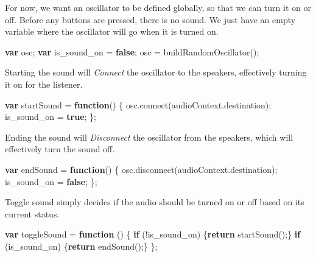 \documentclass[]{article}
\newenvironment{Shaded}{}{}
\newcommand{\KeywordTok}[1]{\textcolor[rgb]{0.00,0.44,0.13}{\textbf{#1}}}
\newcommand{\VariableTok}[1]{\textcolor[rgb]{0.10,0.09,0.49}{#1}}
\newcommand{\ControlFlowTok}[1]{\textcolor[rgb]{0.00,0.44,0.13}{\textbf{#1}}}
\newcommand{\OperatorTok}[1]{\textcolor[rgb]{0.40,0.40,0.40}{#1}}
\newcommand{\AttributeTok}[1]{\textcolor[rgb]{0.49,0.56,0.16}{#1}}
\newcommand{\NormalTok}[1]{#1}
\begin{document}
For now, we want an oscillator to be defined globally, so that we can
turn it on or off. Before any buttons are pressed, there is no sound. We
just have an empty variable where the oscillator will go when it is
turned on.

\begin{Shaded}
\begin{Highlighting}[]
\KeywordTok{var}\NormalTok{ osc}\OperatorTok{;}
\KeywordTok{var}\NormalTok{ is_sound_on }\OperatorTok{=} \KeywordTok{false}\OperatorTok{;}
\NormalTok{osc }\OperatorTok{=} \AttributeTok{buildRandomOscillator}\NormalTok{()}\OperatorTok{;}
\end{Highlighting}
\end{Shaded}

Starting the sound will \emph{Connect} the oscillator to the speakers,
effectively turning it on for the listener.

\begin{Shaded}
\begin{Highlighting}[]
\KeywordTok{var}\NormalTok{ startSound }\OperatorTok{=} \KeywordTok{function}\NormalTok{() }\OperatorTok{\{}
    \VariableTok{osc}\NormalTok{.}\AttributeTok{connect}\NormalTok{(}\VariableTok{audioContext}\NormalTok{.}\AttributeTok{destination}\NormalTok{)}\OperatorTok{;}
\NormalTok{    is_sound_on }\OperatorTok{=} \KeywordTok{true}\OperatorTok{;}
\OperatorTok{\};}
\end{Highlighting}
\end{Shaded}

Ending the sound will \emph{Disconnect} the oscillator from the
speakers, which will effectively turn the sound off.

\begin{Shaded}
\begin{Highlighting}[]
\KeywordTok{var}\NormalTok{ endSound }\OperatorTok{=} \KeywordTok{function}\NormalTok{() }\OperatorTok{\{}
    \VariableTok{osc}\NormalTok{.}\AttributeTok{disconnect}\NormalTok{(}\VariableTok{audioContext}\NormalTok{.}\AttributeTok{destination}\NormalTok{)}\OperatorTok{;}
\NormalTok{    is_sound_on }\OperatorTok{=} \KeywordTok{false}\OperatorTok{;}
\OperatorTok{\};}
\end{Highlighting}
\end{Shaded}

Toggle sound simply decides if the audio should be turned on or off
based on its current status.

\begin{Shaded}
\begin{Highlighting}[]
\KeywordTok{var}\NormalTok{ toggleSound }\OperatorTok{=} \KeywordTok{function}\NormalTok{ () }\OperatorTok{\{}
    \ControlFlowTok{if}\NormalTok{  (}\OperatorTok{!}\NormalTok{is_sound_on)   }\OperatorTok{\{}\ControlFlowTok{return} \AttributeTok{startSound}\NormalTok{()}\OperatorTok{;\}}
    \ControlFlowTok{if}\NormalTok{  (is_sound_on)    }\OperatorTok{\{}\ControlFlowTok{return} \AttributeTok{endSound}\NormalTok{()}\OperatorTok{;\}}
\OperatorTok{\};}
\end{Highlighting}
\end{Shaded}
\end{document}
